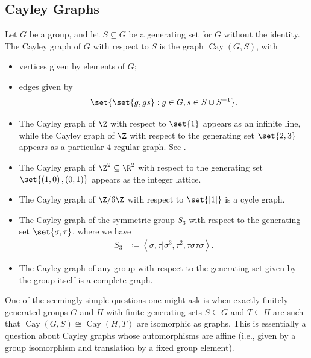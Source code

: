 \documentclass[10pt]{mypackage}
\renewcommand{\coloneq}{\coloneqq}
\begin{document}
\subsection{Cayley Graphs}%
\begin{definition}
  Let $G$ be a group, and let $S\subseteq G$ be a generating set for $G$ without the identity. The Cayley graph of $G$ with respect to $S$ is the graph $ \operatorname{Cay}\left( G,S \right) $, with
  \begin{itemize}
    \item vertices given by elements of $G$;
    \item edges given by
      \begin{align*}
        \set{\set{g,gs} : g\in G,s\in S\cup S^{-1}}.
      \end{align*}
  \end{itemize}
\end{definition}
\begin{example}\hfill
  \begin{itemize}
    \item The Cayley graph of $\Z$ with respect to $\set{1}$ appears as an infinite line, while the Cayley graph of $\Z$ with respect to the generating set $\set{2,3}$ appears as a particular $4$-regular graph. See \cite[Figure 3.3]{loh_geometric_group_theory}.
    \item The Cayley graph of $\Z^2\subseteq \R^2$ with respect to the generating set $\set{\left( 1,0 \right),\left( 0,1 \right)}$ appears as the integer lattice.
    \item The Cayley graph of $\Z/6\Z$ with respect to $\set{[1]}$ is a cycle graph.
    \item The Cayley graph of the symmetric group $S_3$ with respect to the generating set $\set{\sigma,\tau}$, where we have
      \begin{align*}
        S_3 &\coloneq \left\langle \sigma,\tau | \sigma^3,\tau^2,\tau\sigma\tau\sigma \right\rangle.
      \end{align*}
    \item The Cayley graph of any group with respect to the generating set given by the group itself is a complete graph.
  \end{itemize}
\end{example}
One of the seemingly simple questions one might ask is when exactly finitely generated groups $G$ and $H$ with finite generating sets $S\subseteq G$ and $T\subseteq H$ are such that $ \operatorname{Cay}\left( G,S \right) \cong \operatorname{Cay}\left( H,T \right) $ are isomorphic as graphs. This is essentially a question about Cayley graphs whose automorphisms are affine (i.e., given by a group isomorphism and translation by a fixed group element).
\end{document}
